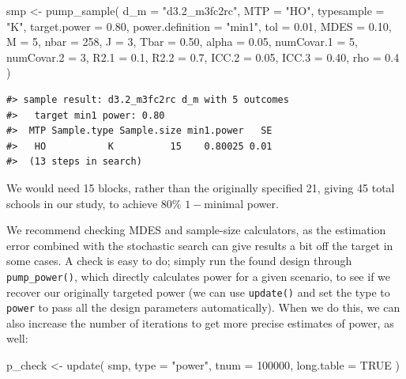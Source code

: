 \documentclass{article}
\newenvironment{Shaded}{\begin{snugshade}}{\end{snugshade}}
\newcommand{\AttributeTok}[1]{\textcolor[rgb]{0.77,0.63,0.00}{#1}}
\newcommand{\ConstantTok}[1]{\textcolor[rgb]{0.00,0.00,0.00}{#1}}
\newcommand{\DecValTok}[1]{\textcolor[rgb]{0.00,0.00,0.81}{#1}}
\newcommand{\FloatTok}[1]{\textcolor[rgb]{0.00,0.00,0.81}{#1}}
\newcommand{\FunctionTok}[1]{\textcolor[rgb]{0.00,0.00,0.00}{#1}}
\newcommand{\NormalTok}[1]{#1}
\newcommand{\OtherTok}[1]{\textcolor[rgb]{0.56,0.35,0.01}{#1}}
\newcommand{\StringTok}[1]{\textcolor[rgb]{0.31,0.60,0.02}{#1}}
\begin{document}
\begin{Shaded}
\begin{Highlighting}[]
\NormalTok{smp }\OtherTok{\textless{}{-}} \FunctionTok{pump\_sample}\NormalTok{(}
  \AttributeTok{d\_m =} \StringTok{"d3.2\_m3fc2rc"}\NormalTok{,}
  \AttributeTok{MTP =} \StringTok{"HO"}\NormalTok{,}
  \AttributeTok{typesample =} \StringTok{"K"}\NormalTok{,}
  \AttributeTok{target.power =} \FloatTok{0.80}\NormalTok{, }\AttributeTok{power.definition =} \StringTok{"min1"}\NormalTok{, }\AttributeTok{tol =} \FloatTok{0.01}\NormalTok{,}
  \AttributeTok{MDES =} \FloatTok{0.10}\NormalTok{, }\AttributeTok{M =} \DecValTok{5}\NormalTok{, }\AttributeTok{nbar =} \DecValTok{258}\NormalTok{, }\AttributeTok{J =} \DecValTok{3}\NormalTok{,}
  \AttributeTok{Tbar =} \FloatTok{0.50}\NormalTok{, }\AttributeTok{alpha =} \FloatTok{0.05}\NormalTok{, }\AttributeTok{numCovar.1 =} \DecValTok{5}\NormalTok{, }\AttributeTok{numCovar.2 =} \DecValTok{3}\NormalTok{,}
  \AttributeTok{R2.1 =} \FloatTok{0.1}\NormalTok{, }\AttributeTok{R2.2 =} \FloatTok{0.7}\NormalTok{, }\AttributeTok{ICC.2 =} \FloatTok{0.05}\NormalTok{, }\AttributeTok{ICC.3 =} \FloatTok{0.40}\NormalTok{, }\AttributeTok{rho =} \FloatTok{0.4}\NormalTok{ )}
\end{Highlighting}
\end{Shaded}

\begin{verbatim}
#> sample result: d3.2_m3fc2rc d_m with 5 outcomes
#>   target min1 power: 0.80
#>  MTP Sample.type Sample.size min1.power   SE
#>   HO           K          15    0.80025 0.01
#>  (13 steps in search)
\end{verbatim}

We would need 15 blocks, rather than the originally specified 21, giving
45 total schools in our study, to achieve 80\% \(1-\)minimal power.

We recommend checking MDES and sample-size calculators, as the
estimation error combined with the stochastic search can give results a
bit off the target in some cases. A check is easy to do; simply run the
found design through \texttt{pump\_power()}, which directly calculates
power for a given scenario, to see if we recover our originally targeted
power (we can use \texttt{update()} and set the type to \texttt{power}
to pass all the design parameters automatically). When we do this, we
can also increase the number of iterations to get more precise estimates
of power, as well:

\begin{Shaded}
\begin{Highlighting}[]
\NormalTok{p\_check }\OtherTok{\textless{}{-}} \FunctionTok{update}\NormalTok{( smp, }\AttributeTok{type =} \StringTok{"power"}\NormalTok{, }\AttributeTok{tnum =} \DecValTok{100000}\NormalTok{,}
                   \AttributeTok{long.table =} \ConstantTok{TRUE}\NormalTok{ )}
\end{Highlighting}
\end{Shaded}
\end{document}
